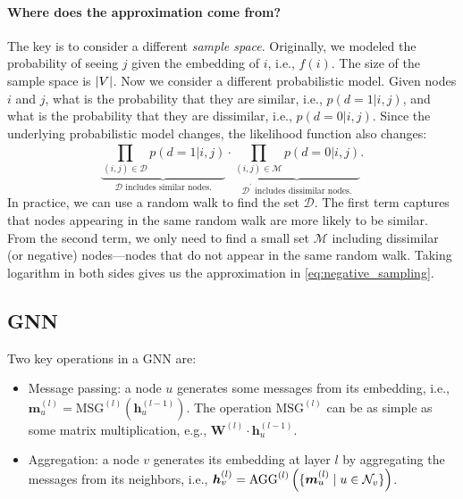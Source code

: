     \paragraph{Where does the approximation come from?}
    The key is to consider a different \emph{sample space}. Originally, we modeled the probability of seeing $j$ given the embedding of $i$, i.e., $f(i)$. The size of the sample space is $| V |$.
    Now we consider a different probabilistic model.
    Given nodes $i$ and $j$, what is the probability that they are similar, i.e., $p(d=1 | i, j)$, and what is the probability that they are dissimilar, i.e., $p(d=0|i,j)$.
    Since the underlying probabilistic model changes, the likelihood function also changes:
        \begin{equation}
            \underbrace{\prod_{(i,j) \in \mathcal{D}}^{}{p(d=1 | i, j)}}_{\text{$\mathcal{D}$ includes similar nodes.}} \cdot \underbrace{\prod_{(i,j) \in \mathcal{M} }^{}{p(d=0| i,j)}}_{\text{$\mathcal{D}^\prime$ includes dissimilar nodes.}}.
        \end{equation}
    In practice, we can use a random walk to find the set $\mathcal{D}$. The first term captures that nodes appearing in the same random walk are more likely to be similar. From the second term,  we only need to find a small set $\mathcal{M}$ including dissimilar (or negative) nodes---nodes that do not appear in the same random walk.
    Taking logarithm in both sides gives us the approximation in \eqref{eq:negative_sampling}.    
    
    
    \subsection{GNN}
        Two key operations in a GNN are:
        \begin{itemize}
            \item Message passing: a node $u$ generates some messages from its embedding, i.e., $\bm{m}_u^{(l)} = \text{MSG}^{(l)}(\bm{h}_u^{(l-1)})$. The operation $\text{MSG}^{(l)}$ can be as simple as some matrix multiplication, e.g., $\bm{W}^{(l)} \cdot \bm{h}^{(l-1)}_u$.
            \item Aggregation: a node $v$ generates its embedding at layer $l$ by aggregating the messages from its neighbors, i.e., $\bm{h}_v^{(l)} = \text{AGG}^{(l)}\left( \{ \bm{m}_u^{(l)}  \mid u \in \mathcal{N}_v \} \right)$.
        \end{itemize}
        
